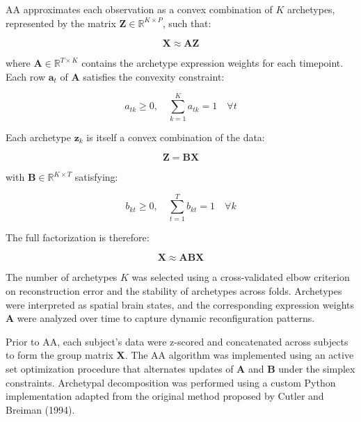 \documentclass[12pt]{article}
\begin{document}
AA approximates each observation as a convex combination of $K$ archetypes, represented by the matrix $\mathbf{Z} \in \mathbb{R}^{K \times P}$, such that:

\[
\mathbf{X} \approx \mathbf{A} \mathbf{Z}
\]

where $\mathbf{A} \in \mathbb{R}^{T \times K}$ contains the archetype expression weights for each timepoint. Each row $\mathbf{a}_t$ of $\mathbf{A}$ satisfies the convexity constraint:

\[
a_{tk} \geq 0, \quad \sum_{k=1}^{K} a_{tk} = 1 \quad \forall t
\]

Each archetype $\mathbf{z}_k$ is itself a convex combination of the data:

\[
\mathbf{Z} = \mathbf{B} \mathbf{X}
\]

with $\mathbf{B} \in \mathbb{R}^{K \times T}$ satisfying:

\[
b_{kt} \geq 0, \quad \sum_{t=1}^{T} b_{kt} = 1 \quad \forall k
\]

The full factorization is therefore:

\[
\mathbf{X} \approx \mathbf{A} \mathbf{B} \mathbf{X}
\]

The number of archetypes $K$ was selected using a cross-validated elbow criterion on reconstruction error and the stability of archetypes across folds. Archetypes were interpreted as spatial brain states, and the corresponding expression weights $\mathbf{A}$ were analyzed over time to capture dynamic reconfiguration patterns.

Prior to AA, each subject’s data were z-scored and concatenated across subjects to form the group matrix $\mathbf{X}$. The AA algorithm was implemented using an active set optimization procedure that alternates updates of $\mathbf{A}$ and $\mathbf{B}$ under the simplex constraints. Archetypal decomposition was performed using a custom Python implementation adapted from the original method proposed by Cutler and Breiman (1994).


\end{document}
